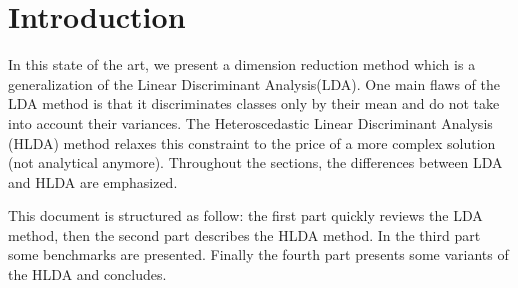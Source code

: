 
\section{Introduction}
\label{sec:introduction}

In this state of the art, we present a dimension reduction method
which is a generalization of the Linear Discriminant Analysis(LDA).
One main flaws of the LDA method is that it discriminates classes only
by their mean and do not take into account their variances. The
Heteroscedastic Linear Discriminant Analysis (HLDA) method relaxes
this constraint to the price of a more complex solution (not
analytical anymore). Throughout the sections, the differences between
LDA and HLDA are emphasized.

This document is structured as follow: the first part quickly reviews
the LDA method, then the second part describes the HLDA method. In the
third part some benchmarks are presented. Finally the fourth part
presents some variants of the HLDA and concludes.
